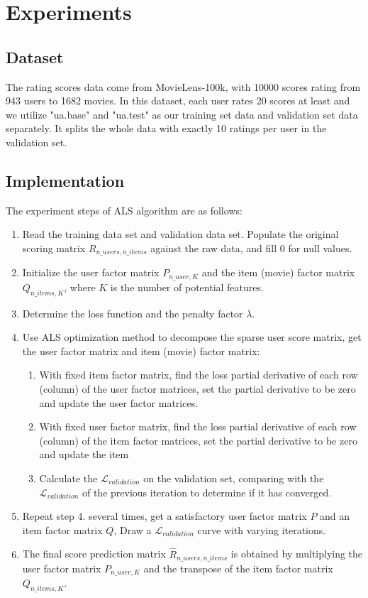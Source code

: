 \documentclass[journal, a4paper]{IEEEtran}
\begin{document}
\section{Experiments}
\subsection{Dataset}
The rating scores data come from MovieLens-100k, with 10000 scores rating from 943 users to 1682 movies. 
In this dataset, each user rates 20 scores at least and we utilize "ua.base" and "ua.test" as our training set data and validation set data separately.
It splits the whole data with exactly 10 ratings per user in the validation set.
\subsection{Implementation}
The experiment steps of ALS algorithm are as follows:
\begin{enumerate}
  \item Read the training data set and validation data set. Populate the original scoring matrix $R_{n\_users,n\_items}$ against the raw data, and fill 0 for null values.
  \item Initialize the user factor matrix $P_{n\_user,K}$ and the item (movie) factor matrix $Q_{n\_items,K}$, where $K$ is the number of potential features.
  \item Determine the loss function and the penalty factor $\lambda$.
  \item Use ALS optimization method to decompose the sparse user score matrix, get the user factor matrix and item (movie) factor matrix:
      \begin{enumerate}
        \item With fixed item factor matrix, find the loss partial derivative of each row (column) of the user factor matrices, set the partial derivative to be zero and update the user factor matrices.
        \item With fixed user factor matrix, find the loss partial derivative of each row (column) of the item factor matrices, set the partial derivative to be zero and update the item
        \item Calculate the $\mathcal{L}_{validation}$ on the validation set, comparing with the $\mathcal{L}_{validation}$ of the previous iteration to determine if it has converged.
      \end{enumerate}
  \item Repeat step 4. several times, get a satisfactory user factor matrix $P$ and an item factor matrix $Q$, Draw a $\mathcal{L}_{validation}$ curve with varying iterations.
  \item The final score prediction matrix $\hat{R}_{n\_users,n\_items}$ is obtained by multiplying the user factor matrix $P_{n\_user,K}$ and the transpose of the item factor matrix $Q_{n\_items,K}$.
\end{enumerate}
\end{document}
